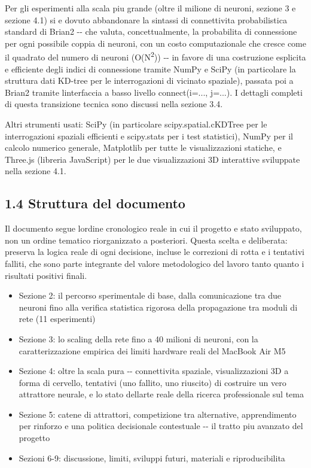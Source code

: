 \documentclass[
  italian,
]{article}
\begin{document}
Per gli esperimenti alla scala piu\textquotesingle{} grande (oltre il milione di neuroni, sezione 3 e sezione 4.1) si e\textquotesingle{} dovuto abbandonare la sintassi di connettivita\textquotesingle{} probabilistica standard di Brian2 -\/- che valuta, concettualmente, la probabilita\textquotesingle{} di connessione per ogni possibile coppia di neuroni, con un costo computazionale che cresce come il quadrato del numero di neuroni (O(N\textsuperscript{2})) -\/- in favore di una costruzione esplicita e efficiente degli indici di connessione tramite NumPy e SciPy (in particolare la struttura dati KD-tree per le interrogazioni di vicinato spaziale), passata poi a Brian2 tramite l\textquotesingle interfaccia a basso livello connect(i=..., j=...). I dettagli completi di questa transizione tecnica sono discussi nella sezione 3.4.

Altri strumenti usati: SciPy (in particolare scipy.spatial.cKDTree per le interrogazioni spaziali efficienti e scipy.stats per i test statistici), NumPy per il calcolo numerico generale, Matplotlib per tutte le visualizzazioni statiche, e Three.js (libreria JavaScript) per le due visualizzazioni 3D interattive sviluppate nella sezione 4.1.

\subsection{1.4 Struttura del documento}\label{struttura-del-documento}

Il documento segue l\textquotesingle ordine cronologico reale in cui il progetto e\textquotesingle{} stato sviluppato, non un ordine tematico riorganizzato a posteriori. Questa scelta e\textquotesingle{} deliberata: preserva la logica reale di ogni decisione, incluse le correzioni di rotta e i tentativi falliti, che sono parte integrante del valore metodologico del lavoro tanto quanto i risultati positivi finali.

\begin{itemize}
\item
  Sezione 2: il percorso sperimentale di base, dalla comunicazione tra due neuroni fino alla verifica statistica rigorosa della propagazione tra moduli di rete (11 esperimenti)
\item
  Sezione 3: lo scaling della rete fino a 40 milioni di neuroni, con la caratterizzazione empirica dei limiti hardware reali del MacBook Air M5
\item
  Sezione 4: oltre la scala pura -\/- connettivita\textquotesingle{} spaziale, visualizzazioni 3D a forma di cervello, tentativi (uno fallito, uno riuscito) di costruire un vero attrattore neurale, e lo stato dell\textquotesingle arte reale della ricerca professionale sul tema
\item
  Sezione 5: catene di attrattori, competizione tra alternative, apprendimento per rinforzo e una politica decisionale contestuale -\/- il tratto piu\textquotesingle{} avanzato del progetto
\item
  Sezioni 6-9: discussione, limiti, sviluppi futuri, materiali e riproducibilita\textquotesingle{}
\end{itemize}
\end{document}
